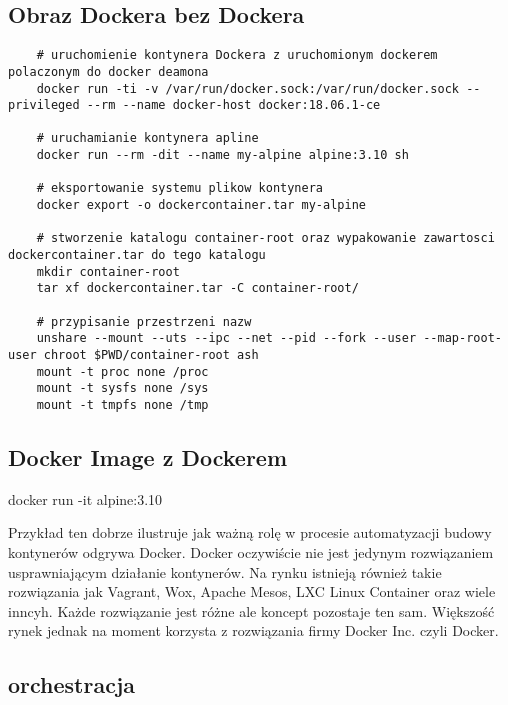 \subsection{Obraz Dockera bez Dockera}
\begin{lstlisting}
    # uruchomienie kontynera Dockera z uruchomionym dockerem polaczonym do docker deamona
    docker run -ti -v /var/run/docker.sock:/var/run/docker.sock --privileged --rm --name docker-host docker:18.06.1-ce

    # uruchamianie kontynera apline 
    docker run --rm -dit --name my-alpine alpine:3.10 sh

    # eksportowanie systemu plikow kontynera
    docker export -o dockercontainer.tar my-alpine

    # stworzenie katalogu container-root oraz wypakowanie zawartosci dockercontainer.tar do tego katalogu
    mkdir container-root
    tar xf dockercontainer.tar -C container-root/

    # przypisanie przestrzeni nazw
    unshare --mount --uts --ipc --net --pid --fork --user --map-root-user chroot $PWD/container-root ash 
    mount -t proc none /proc
    mount -t sysfs none /sys
    mount -t tmpfs none /tmp

\end{lstlisting}

\subsection{Docker Image z Dockerem}
docker run -it alpine:3.10

Przykład ten dobrze ilustruje jak ważną rolę w procesie automatyzacji budowy kontynerów odgrywa Docker.
Docker oczywiście nie jest jedynym rozwiązaniem usprawniającym działanie kontynerów. Na rynku istnieją również takie rozwiązania jak Vagrant, Wox, Apache Mesos, LXC Linux Container oraz wiele inncyh. Każde rozwiązanie jest różne ale koncept pozostaje ten sam. Większość rynek jednak na moment korzysta z rozwiązania firmy Docker Inc. czyli Docker.


\subsection{orchestracja}

